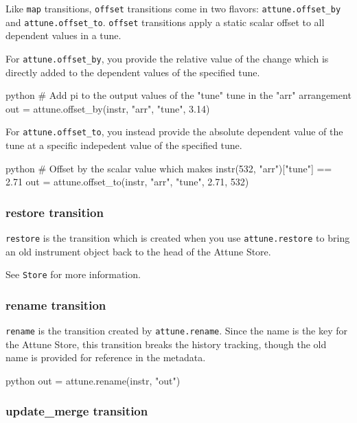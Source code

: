 Like \texttt{map} transitions, \texttt{offset} transitions come in two
flavors: \texttt{attune.offset\_by} and \texttt{attune.offset\_to}.
\texttt{offset} transitions apply a static scalar offset to all
dependent values in a tune.

For \texttt{attune.offset\_by}, you provide the relative value of the
change which is directly added to the dependent values of the specified
tune.

\begin{codefragment}{python}
# Add pi to the output values of the "tune" tune in the "arr" arrangement
out = attune.offset_by(instr, "arr", "tune", 3.14)
\end{codefragment}

For \texttt{attune.offset\_to}, you instead provide the absolute
dependent value of the tune at a specific indepedent value of the
specified tune.

\begin{codefragment}{python}
# Offset by the scalar value which makes instr(532, "arr")["tune"] == 2.71
out = attune.offset_to(instr, "arr", "tune", 2.71, 532)
\end{codefragment}

\hypertarget{restore-transition}{%
\subsubsection{restore transition}\label{restore-transition}}

\texttt{restore} is the transition which is created when you use
\texttt{attune.restore} to bring an old instrument object back to the
head of the Attune Store.

See \texttt{Store} for more information.

\hypertarget{rename-transition}{%
\subsubsection{rename transition}\label{rename-transition}}

\texttt{rename} is the transition created by \texttt{attune.rename}.
Since the name is the key for the Attune Store, this transition breaks
the history tracking, though the old name is provided for reference in
the metadata.

\begin{codefragment}{python}
out = attune.rename(instr, "out")
\end{codefragment}

\hypertarget{update_merge-transition}{%
\subsubsection{update\_merge transition}\label{update_merge-transition}}

